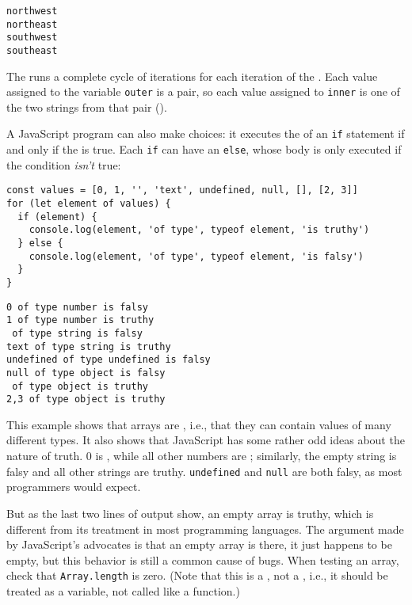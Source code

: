 \begin{verbatim}
northwest
northeast
southwest
southeast
\end{verbatim}

The  runs a complete cycle of iterations
for each iteration of the .
Each value assigned to the variable \texttt{outer} is a pair,
so each value assigned to \texttt{inner} is one of the two strings from that pair
().


A JavaScript program can also make choices:
it executes the  of an \texttt{if} statement
if and only if the  is true.
Each \texttt{if} can have an \texttt{else},
whose body is only executed if the condition \emph{isn't} true:

\begin{verbatim}
const values = [0, 1, '', 'text', undefined, null, [], [2, 3]]
for (let element of values) {
  if (element) {
    console.log(element, 'of type', typeof element, 'is truthy')
  } else {
    console.log(element, 'of type', typeof element, 'is falsy')
  }
}
\end{verbatim}

\begin{verbatim}
0 of type number is falsy
1 of type number is truthy
 of type string is falsy
text of type string is truthy
undefined of type undefined is falsy
null of type object is falsy
 of type object is truthy
2,3 of type object is truthy
\end{verbatim}

This example shows that arrays are ,
i.e.,
that they can contain values of many different types.
It also shows that JavaScript has some rather odd ideas about the nature of truth.
0 is ,
while all other numbers are ;
similarly,
the empty string is falsy and all other strings are truthy.
\texttt{undefined} and \texttt{null} are both falsy,
as most programmers would expect.

But as the last two lines of output show,
an empty array is truthy,
which is different from its treatment in most programming languages.
The argument made by JavaScript's advocates is that an empty array is there,
it just happens to be empty,
but this behavior is still a common cause of bugs.
When testing an array,
check that \texttt{Array.length} is zero.
(Note that this is a ,
not a ,
i.e.,
it should be treated as a variable,
not called like a function.)

